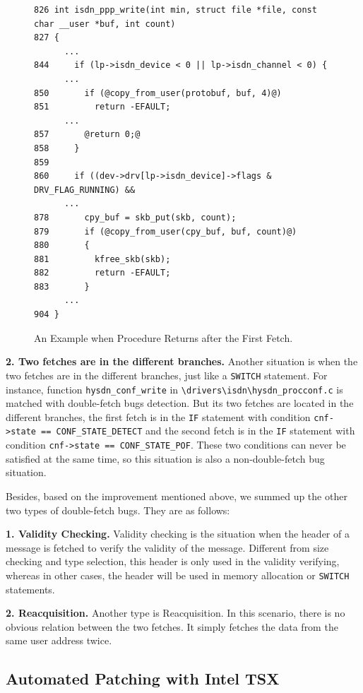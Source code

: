 \documentclass[10pt]{llncs}
\begin{document}
\begin{figure}[t]
  \centering
\begin{lstlisting}[style=code]
826 int isdn_ppp_write(int min, struct file *file, const char __user *buf, int count)
827 {
	  ...
844     if (lp->isdn_device < 0 || lp->isdn_channel < 0) {
	  ...
850       if (@copy_from_user(protobuf, buf, 4)@)
851         return -EFAULT;
	  ...
857       @return 0;@
858     }
859 
860     if ((dev->drv[lp->isdn_device]->flags & DRV_FLAG_RUNNING) &&
	  ...
878       cpy_buf = skb_put(skb, count);
879       if (@copy_from_user(cpy_buf, buf, count)@)
880       {
881         kfree_skb(skb);
882         return -EFAULT;
883       }
	  ...
904 } 
\end{lstlisting}
  \caption{An Example when Procedure Returns after the First Fetch.}
  \label{return}
\end{figure}

\textbf{2. Two fetches are in the different branches.}
Another situation is when the two fetches are in the different branches, just like a \verb:SWITCH: statement. For instance, function \verb:hysdn_conf_write: in \verb:\drivers\isdn\hysdn_procconf.c: is matched with double-fetch bugs detection. But its two fetches are located in the different branches, the first fetch is in the \verb:IF: statement with condition \texttt{cnf->state == CONF\_STATE\_DETECT} and the second fetch is in the \verb:IF: statement with condition \texttt{cnf->state == CONF\_STATE\_POF}. These two conditions can never be satisfied at the same time, so this situation is also a non-double-fetch bug situation.

Besides, based on the improvement mentioned above, we summed up the other two types of double-fetch bugs. They are as follows:

\textbf{1. Validity Checking.}
Validity checking is the situation when the header of a message is fetched to verify the validity of the message. Different from size checking and type selection, this header is only used in the validity verifying, whereas in other cases, the header will be used in memory allocation or \verb:SWITCH: statements.

\textbf{2. Reacquisition.}
Another type is Reacquisition. In this scenario, there is no obvious relation between the two fetches. It simply fetches the data from the same user address twice.


\subsection{Automated Patching with Intel TSX}
\label{design2}
\end{document}
